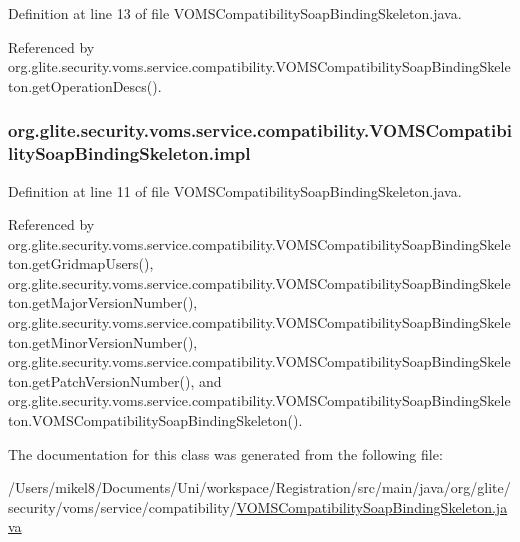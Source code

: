Definition at line 13 of file VOMSCompatibilitySoapBindingSkeleton.java.



Referenced by org.glite.security.voms.service.compatibility.VOMSCompatibilitySoapBindingSkeleton.getOperationDescs().

\hypertarget{classorg_1_1glite_1_1security_1_1voms_1_1service_1_1compatibility_1_1VOMSCompatibilitySoapBindingSkeleton_a36ff3050b5c95f7655bd883de30eaaca}{
\subsubsection[{impl}]{ {\bf org.glite.security.voms.service.compatibility.VOMSCompatibilitySoapBindingSkeleton.impl}}}
\label{classorg_1_1glite_1_1security_1_1voms_1_1service_1_1compatibility_1_1VOMSCompatibilitySoapBindingSkeleton_a36ff3050b5c95f7655bd883de30eaaca}


Definition at line 11 of file VOMSCompatibilitySoapBindingSkeleton.java.



Referenced by org.glite.security.voms.service.compatibility.VOMSCompatibilitySoapBindingSkeleton.getGridmapUsers(), org.glite.security.voms.service.compatibility.VOMSCompatibilitySoapBindingSkeleton.getMajorVersionNumber(), org.glite.security.voms.service.compatibility.VOMSCompatibilitySoapBindingSkeleton.getMinorVersionNumber(), org.glite.security.voms.service.compatibility.VOMSCompatibilitySoapBindingSkeleton.getPatchVersionNumber(), and org.glite.security.voms.service.compatibility.VOMSCompatibilitySoapBindingSkeleton.VOMSCompatibilitySoapBindingSkeleton().



The documentation for this class was generated from the following file:\begin{DoxyCompactItemize}
\item 
/Users/mikel8/Documents/Uni/workspace/Registration/src/main/java/org/glite/security/voms/service/compatibility/\hyperlink{VOMSCompatibilitySoapBindingSkeleton_8java}{VOMSCompatibilitySoapBindingSkeleton.java}\end{DoxyCompactItemize}
